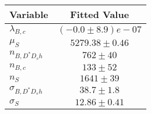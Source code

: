 \begin{tabular}[t]{lc}
\hline
Variable &Fitted Value\\
\hline\hline
$\lambda_{B,c}$&$(-0.0\pm8.9)e-07$\\
\hline
$\mu_S$&$5279.38\pm0.46$\\
\hline
$n_{B, D^* D_s h}$&$762\pm40$\\
\hline
$n_{B,c}$&$133\pm52$\\
\hline
$n_S$&$1641\pm39$\\
\hline
$\sigma_{B, D^* D_s h}$&$38.7\pm1.8$\\
\hline
$\sigma_S$&$12.86\pm0.41$\\
\hline
\end{tabular}